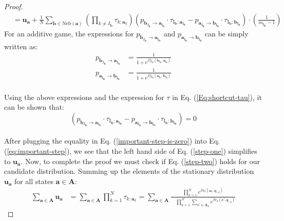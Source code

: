 \documentclass[11pt]{article}
\theoremstyle{plainCl1}
\theoremstyle{plainCl2}
\newcommand{\A}{\mathbf{A}}
\newcommand{\abf}{\mathbf{a}}
\newcommand{\bbf}{\mathbf{b}}
\newcommand{\qbf}{\mathbf{q}}
\newcommand{\ubf}{\mathbf{u}}
\begin{document}
\begin{proof}
\begin{align}
\label{eq:important-step}
&= \ubf_\abf +  \frac{1}{N} \sum_{\bbf \in \mathrm{Neb}(\abf)} \left( \prod_{k \neq I_\bbf} \tau_{k:\abf_k} \right) \left( p_{\bbf_{I_\bbf} \to \abf_{\mathrm{I}_\bbf}} \cdot \tau_{\mathrm{I}_\bbf: \abf_{\mathrm{I}_\bbf}} -  p_{\abf_{\mathrm{I}_\bbf} \to \bbf_{\mathrm{I}_\bbf}} \cdot \tau_{\mathrm{I}_\bbf: \bbf_{\mathrm{I}_\bbf}} \right) \cdot \left(  \frac{1}{m_{\mathrm{I}_\bbf}-1} \right)
\end{align}
\noindent For an additive game, the expressions for $p_{\bbf_{I_\bbf} \to \abf_{\mathrm{I}_\bbf}}$ and $p_{\abf_{\mathrm{I}_\bbf} \to \bbf_{\mathrm{I}_\bbf}}$ can be simply written as: 
\begin{align}
p_{\bbf_{I_\bbf} \to \abf_{\mathrm{I}_\bbf}} &=\frac{1}{1 + \displaystyle e^{\beta f_{\mathrm{I}_\bbf}(\bbf_{\mathrm{I}_\bbf}, \abf_{\mathrm{I}_\bbf})}} \\[10pt] 
p_{\abf_{\mathrm{I}_\bbf} \to \bbf_{\mathrm{I}_\bbf}} &= \frac{1}{1 + \displaystyle e^{\beta f_{\mathrm{I}_\bbf}(\abf_{\mathrm{I}_\bbf}, \bbf_{\mathrm{I}_\bbf})}} 
\end{align} \\
Using the above expressions and the expression for $\tau$ in Eq. (\ref{Eq:shortcut-tau}), it can be shown that: 
\begin{equation}
\left( p_{\bbf_{I_\bbf} \to \abf_{\mathrm{I}_\bbf}} \cdot \tau_{\mathrm{I}_\bbf: \abf_{\mathrm{I}_\bbf}} -  p_{\abf_{\mathrm{I}_\bbf} \to \bbf_{\mathrm{I}_\bbf}} \cdot \tau_{\mathrm{I}_\bbf: \bbf_{\mathrm{I}_\bbf}} \right) = 0 
\label{important-step-is-zero}
\end{equation}
\\ \noindent After plugging the equality in Eq. (\ref{important-step-is-zero}) into Eq. (\ref{eq:important-step}), we see that the left hand side of Eq. (\ref{step-one}) simplifies to $\ubf_{\abf}$. Now, to complete the proof we must check if Eq. (\ref{step-two}) holds for our candidate distribution. Summing up the elements of the stationary distribution $\ubf_\abf$ for all states $\abf \in \A$: \\ 
\begin{align}
\sum_{\abf \in \A} \ubf_\abf &= \sum_{\abf \in \A} \prod_{k=1}^N \tau_{k:\abf_k} = \sum_{\abf \in \A} \frac{\displaystyle \prod_{k=1}^N e^{\beta \pi_k(\abf_k, \qbf_{-k})}}{\displaystyle \quad \prod_{k=1}^N \sum_{a' \in \A_k} e^{\beta \pi_k(a',\qbf_{-k})}}
\end{align}

\end{proof}
\end{document}
